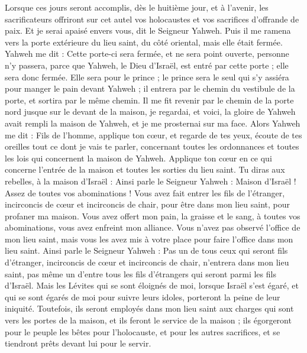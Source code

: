 \begin{multicols}{2}
Lorsque ces jours seront accomplis, dès le huitième jour, et à l’avenir, les sacrificateurs offriront sur cet autel vos holocaustes et vos sacrifices d’offrande de paix. Et je serai apaisé envers vous, dit le Seigneur Yahweh.
\VerseOne{}Puis il me ramena vers la porte extérieure du lieu saint, du côté oriental, mais elle était fermée.
Yahweh me dit : Cette porte-ci sera fermée, et ne sera point ouverte, personne n'y passera, parce que Yahweh, le Dieu d'Israël, est entré par cette porte ; elle sera donc fermée.
Elle sera pour le prince ; le prince sera le seul qui s'y assiéra pour manger le pain devant Yahweh ; il entrera par le chemin du vestibule de la porte, et sortira par le même chemin.
Il me fit revenir par le chemin de la porte nord jusque sur le devant de la maison, je regardai, et voici, la gloire de Yahweh avait rempli la maison de Yahweh, et je me prosternai sur ma face.
Alors Yahweh me dit : Fils de l’homme, applique ton cœur, et regarde de tes yeux, écoute de tes oreilles tout ce dont je vais te  parler, concernant toutes les ordonnances et toutes les lois qui concernent la maison de Yahweh. Applique ton cœur en ce qui concerne l'entrée de la maison et toutes les sorties du lieu saint.
Tu diras aux rebelles, à la maison d'Israël : Ainsi parle le Seigneur Yahweh : Maison d'Israël ! Assez de toutes vos abominations !
Vous avez fait entrer les fils de l'étranger, incirconcis de cœur et incirconcis de chair, pour être dans mon lieu saint, pour profaner ma maison. Vous avez offert mon pain, la graisse et le sang, à toutes vos abominations, vous avez enfreint mon alliance.
Vous n'avez pas observé l’office de mon lieu saint, mais vous les avez mis à votre place pour faire l’office dans mon lieu saint.
Ainsi parle le Seigneur Yahweh : Pas un de tous ceux qui seront fils d'étranger, incirconcis de cœur et incirconcis de chair, n'entrera dans mon lieu saint, pas même un d'entre tous les fils d'étrangers qui seront parmi les fils d'Israël.
Mais les Lévites qui se sont éloignés de moi, lorsque Israël s'est égaré, et qui se sont égarés de moi pour suivre leurs idoles, porteront la peine de leur iniquité.
Toutefois, ils seront employés dans mon lieu saint aux charges qui sont vers les portes de la maison, et ils feront le service de la maison ; ils égorgeront pour le peuple les bêtes pour l'holocauste, et pour les autres sacrifices, et se tiendront prêts devant lui pour le servir.

\end{multicols}
